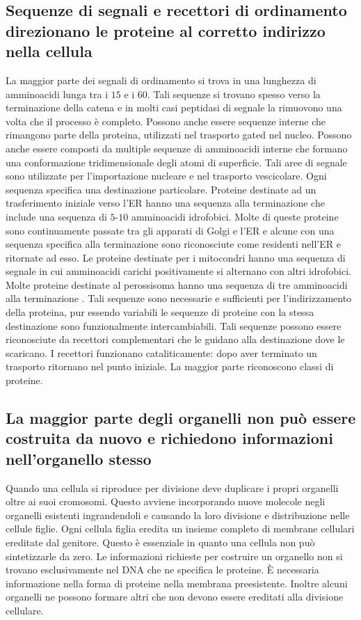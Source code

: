 \subsection{Sequenze di segnali e recettori di ordinamento direzionano le proteine al corretto indirizzo nella cellula}
La maggior parte dei segnali di ordinamento si trova in una lunghezza di amminoacidi lunga tra i $15$ e i $60$. Tali sequenze si trovano spesso verso la terminazione  della catena
e in molti casi peptidasi di segnale la rimuovono una volta che il processo \`e completo. Possono anche essere sequenze interne che rimangono parte della proteina, utilizzati nel 
trasporto gated nel nucleo. Possono anche essere composti da multiple sequenze di amminoacidi interne che formano una conformazione tridimensionale degli atomi di superficie. Tali 
aree di segnale sono utilizzate per l'importazione nucleare e nel trasporto vescicolare. Ogni sequenza specifica una destinazione particolare. Proteine destinate ad un trasferimento 
iniziale verso l'ER hanno una sequenza alla terminazione  che include una sequenza di $5$-$10$ amminoacidi idrofobici. Molte di queste proteine sono continuamente passate tra gli
apparati di Golgi e l'ER e alcune con una sequenza specifica alla terminazione  sono riconosciute come residenti nell'ER e ritornate ad esso. Le proteine destinate per i mitocondri
hanno una sequenza di segnale in cui amminoacidi carichi positivamente si alternano con altri idrofobici. Molte proteine destinate al perossisoma hanno una sequenza di tre amminoacidi
alla terminazione . Tali sequenze sono necessarie e sufficienti per l'indirizzamento della proteina, pur essendo variabili le sequenze di proteine con la stessa destinazione sono
funzionalmente intercambiabili. Tali sequenze possono essere riconosciute da recettori complementari che le guidano alla destinazione dove le scaricano. I recettori funzionano 
cataliticamente: dopo aver terminato un trasporto ritornano nel punto iniziale. La maggior parte riconoscono classi di proteine. 
\subsection{La maggior parte degli organelli non pu\`o essere costruita da nuovo e richiedono informazioni nell'organello stesso}
Quando una cellula si riproduce per divisione deve duplicare i propri organelli oltre ai suoi cromosomi. Questo avviene incorporando nuove molecole negli organelli esistenti 
ingrandendoli e causando la loro divisione e distribuzione nelle cellule figlie. Ogni cellula figlia eredita un insieme completo di membrane cellulari ereditate dal genitore. Questo \`e
essenziale in quanto una cellula non pu\`o sintetizzarle da zero. Le informazioni richieste per costruire un organello non si trovano esclusivamente nel DNA che ne specifica le proteine.
\`E necessaria informazione nella forma di proteine nella membrana preesistente. Inoltre alcuni organelli ne possono formare altri che non devono essere ereditati alla divisione 
cellulare. 
